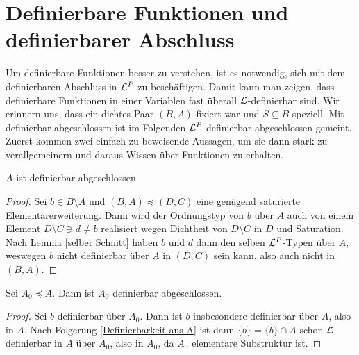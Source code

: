 \section{Definierbare Funktionen und definierbarer Abschluss}
Um definierbare Funktionen besser zu verstehen, ist es notwendig, sich mit dem definierbaren Abschluss in $\mathcal{L}^P$ zu beschäftigen. Damit kann man zeigen, dass definierbare Funktionen in einer Variablen \glqq{}fast überall\grqq{} $\mathcal{L}$-definierbar sind. Wir erinnern uns, dass ein dichtes Paar $(B,A)$ fixiert war und $S\subseteq B$ speziell. Mit \glqq{}definierbar abgeschlossen\grqq{} ist im Folgenden \glqq{}$\mathcal{L}^P$-definierbar abgeschlossen\grqq{} gemeint. Zuerst kommen zwei einfach zu beweisende Aussagen, um sie dann stark zu verallgemeinern und daraus Wissen über Funktionen zu erhalten.

\begin{lemma}\label{A definierbar abgeschl}
	$A$ ist definierbar abgeschlossen.
\end{lemma}
\begin{proof}
	Sei $b\in B\setminus A$ und $(B,A)\preceq(D,C)$ eine genügend saturierte Elementarerweiterung. Dann wird der Ordnungstyp von $b$ über $A$ auch von einem Element $D\setminus C\ni d\neq b$ realisiert wegen Dichtheit von $D\setminus C$ in $D$ und Saturation.\\
	Nach Lemma \ref{selber Schnitt} haben $b$ und $d$ dann den selben $\mathcal{L}^P$-Typen über $A$, weswegen $b$ nicht definierbar über $A$ in $(D,C)$ sein kann, also auch nicht in $(B,A)$.
\end{proof}

\begin{corollary}
	Sei $A_0\preceq A$. Dann ist $A_0$ definierbar abgeschlossen.
\end{corollary}
\begin{proof}
	Sei $b$ definierbar über $A_0$. Dann ist $b$ insbesondere definierbar über $A$, also in $A$. Nach Folgerung \ref{Definierbarkeit aus A} ist dann $\{b\}=\{b\}\cap A$ schon $\mathcal{L}$-definierbar in $A$ über $A_0$, also in $A_0$, da $A_0$ elementare Substruktur ist.
\end{proof}

